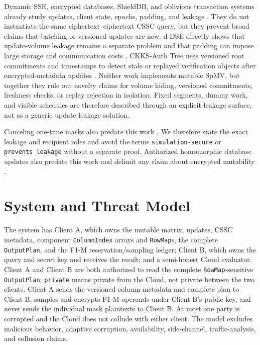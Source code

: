 Dynamic SSE, encrypted databases, ShieldDB, and oblivious transaction systems already study updates, client state, epochs, padding, and leakage \cite{cash2014dynamic,vo2021shielddb,crooks2018obladi}. They do not instantiate the same ciphertext--ciphertext CSSC query, but they prevent broad claims that batching or versioned updates are new. d-DSE directly shows that update-volume leakage remains a separate problem and that padding can impose large storage and communication costs \cite{liu2024ddse}. CKKS-Auth Tree uses versioned root commitments and timestamps to detect stale or replayed verification objects after encrypted-metadata updates \cite{chen2026ckksauthtree}. Neither work implements mutable SpMV, but together they rule out novelty claims for volume hiding, versioned commitments, freshness checks, or replay rejection in isolation. Fixed segments, dummy work, and visible schedules are therefore described through an explicit leakage surface, not as a generic update-leakage solution.

Canceling one-time masks also predate this work \cite{bonawitz2017secureagg}. We therefore state the exact leakage and recipient roles and avoid the terms \texttt{simulation-secure} or \texttt{prevents\ leakage} without a separate proof. Authorized homomorphic database updates also predate this work and delimit any claim about encrypted mutability \cite{parbat2023authorized}.

\section{System and Threat Model}\label{system-and-threat-model}

The system has Client A, which owns the mutable matrix, updates, CSSC metadata, component \texttt{ColumnIndex} arrays and \texttt{RowMap}s, the complete \texttt{OutputPlan}, and the F1-M reservation/sampling ledger; Client B, which owns the query and secret key and receives the result; and a semi-honest Cloud evaluator. Client A and Client B are both authorized to read the complete \texttt{RowMap}-sensitive \texttt{OutputPlan}; \texttt{private} means private from the Cloud, not private between the two clients. Client A sends the versioned column metadata and complete plan to Client B, samples and encrypts F1-M operands under Client B's public key, and never sends the individual mask plaintexts to Client B. At most one party is corrupted and the Cloud does not collude with either client. The model excludes malicious behavior, adaptive corruption, availability, side-channel, traffic-analysis, and collusion claims.

